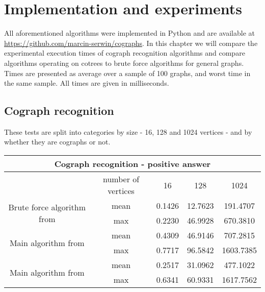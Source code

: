 \section{Implementation and experiments}

All aforementioned algorithms were implemented in Python and are available at \url{https://github.com/marcin-serwin/cographs}. In this chapter we will compare the experimental execution times of cograph recognition algorithms and compare algorithms operating on cotrees to brute force algorithms for general graphs. Times are presented as average over a sample of 100 graphs, and worst time in the same sample. All times are given in milliseconds.

\subsection{Cograph recognition}
These tests are split into categories by size - 16, 128 and 1024 vertices - and by whether they are cographs or not.

\begin{center}

    \begin{tabular}{ |c|c|c|c|c|}
        \hline
        \multicolumn{5}{|c|}{Cograph recognition - positive answer}                                                  \\
        \hline
                                                                 & number of vertices & 16     & 128     & 1024      \\
        \hline
        \multirow{2}{*}{Brute force algorithm from \cite{habib}} & mean               & 0.1426 & 12.7623 & 191.4707  \\
                                                                 & max                & 0.2230 & 46.9928 & 670.3810  \\
        \hline
        \multirow{2}{*}{Main algorithm from \cite{habib}}        & mean               & 0.4309 & 46.9146 & 707.2815  \\
                                                                 & max                & 0.7717 & 96.5842 & 1603.7385 \\
        \hline
        \multirow{2}{*}{Main algorithm from \cite{corneil}}      & mean               & 0.2517 & 31.0962 & 477.1022  \\
                                                                 & max                & 0.6341 & 60.9331 & 1617.7562 \\
        \hline
    \end{tabular}
\end{center}

